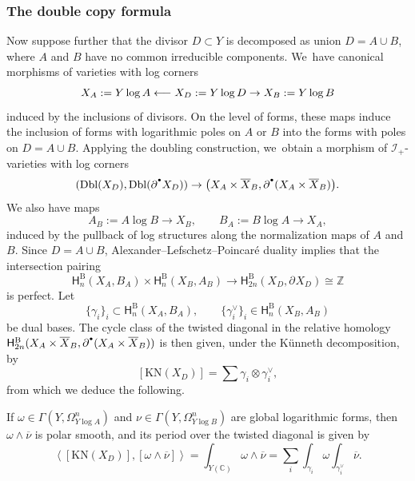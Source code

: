 \documentclass[JEP,XML,SOM,Unicode,NoFloatCountersInSection,published]{cedram}
\let\oldbullet\bullet
\renewcommand{\bullet}{{\raisebox{1pt}{$\scriptscriptstyle\oldbullet$}}}
\newcommand\from{\mathchoice{\longleftarrow}{\leftarrow}{\leftarrow}{\leftarrow}}
\newcommand{\rbirac}[1]{\bigl(#1\bigr)}
\theoremstyle{definition}
\theoremstyle{remark}
\newcommand{\CC}{\mathbb{C}}
\newcommand{\ZZ}{\mathbb{Z}}
\newcommand{\abrac}[1]{\left\langle#1\right\rangle}
\newcommand{\bdX}[1][]{\partial^{#1} X}
\newcommand{\cX}{\overline{X}}
\newcommand{\KN}[1]{\mathrm{KN}(#1)}
\newcommand{\Dbl}[1]{\mathrm{Dbl}(#1)}
\newcommand{\sect}[1]{\mathsf{\Gamma}(#1)}
\newcommand{\HlgyB}[2][\bullet]{\mathsf{H}^{\mathrm{B}}_{#1}(#2)}
\newcommand{\forms}[2][\bullet]{\Omega^{#1}_{#2}}
\newcommand{\ascat}{\mathscr{I}_+}
\begin{document}
\subsubsection{The double copy formula}
Now suppose further that the divisor $D \subset Y$ is decomposed as union $D = A \cup B$, where $A$ and $B$ have no common irreducible components. We~have canonical morphisms of varieties with log corners\vspace*{-3pt}
\[
X_A := Y \log A \from X_D := Y \log D \to X_B := Y \log B
\]
induced by the inclusions of divisors. On the level of forms, these maps induce the inclusion of forms with logarithmic poles on $A$ or $B$ into the forms with poles on $D = A \cup B$. Applying the doubling construction, we~obtain a morphism of $\ascat$-varieties with log corners\vspace*{-3pt}
\begin{equation}
(\Dbl{X_D},\Dbl{\bdX[\bullet]_D}) \to \rbirac{X_A\times \cX_B, \partial^\bullet(X_A \times \cX_B)}.
\label{eq:double-copy-pairs}
\end{equation}
We also have maps\vspace*{-3pt}
\[
A_B := A \log B \to X_B, \qquad B_A := B \log A \to X_A,
\]
induced by the pullback of log structures along the normalization maps of $A$ and $B$. Since $D = A \cup B$, Alexander--Lefschetz--Poincaré duality implies that the intersection pairing\vspace*{-3pt}
\[
\HlgyB[n]{X_A,B_A} \times \HlgyB[n]{X_B,A_B} \to \HlgyB[2n]{X_D,\bdX_D} \cong \ZZ
\]
is perfect. Let\vspace*{-3pt}
\[
\{\gamma_i\}_i \subset \HlgyB[n]{X_A,B_A}, \qquad
\{\gamma_i^\vee\}_i \in \HlgyB[n]{X_B,A_B}
\]
be dual bases. The cycle class of the twisted diagonal in the relative homology $\HlgyB[2n]{X_A\times\cX_B,\partial^\bullet(X_A\times\cX_B)}$ is then given, under the Künneth decomposition, by\vspace*{-3pt}
\[
[\KN{X_D}] = \sum \gamma_i \otimes \gamma_i^\vee,
\]
from which we deduce the following.
\begin{proposition}
If $\omega \in \sect{Y,\forms[n]{Y \log A}}$ and $\nu \in \sect{Y,\forms[n]{Y \log B}}$ are global logarithmic forms, then $\omega \wedge \overline{\nu}$ is polar smooth, and its period over the twisted diagonal is given by\vspace*{-3pt}
\[
\abrac{[\KN{X_D}],[\omega\wedge\overline{\nu}]} = \int_{Y(\CC)}\omega \wedge \overline{\nu} = \sum_i \int_{\gamma_i}\omega \int_{\gamma_i^\vee} \overline{\nu}.
\]
\end{proposition}
\end{document}
